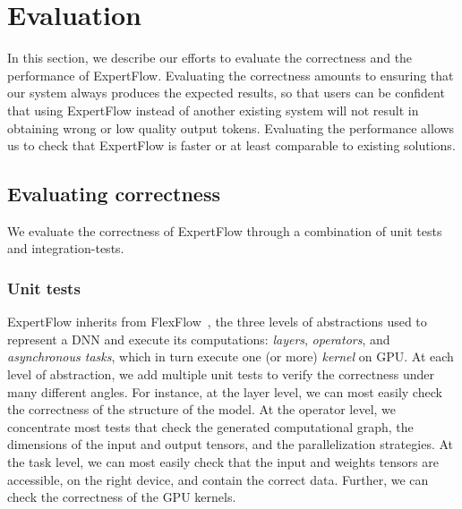 
\chapter{Evaluation}\label{chapter-7}
In this section, we describe our efforts to evaluate the correctness and the performance of ExpertFlow. Evaluating the correctness amounts to ensuring that our system always produces the expected results, so that users can be confident that using ExpertFlow instead of another existing system will not result in obtaining wrong or low quality output tokens. Evaluating the performance allows us to check that ExpertFlow is faster or at least comparable to existing solutions.

\section{Evaluating correctness}\label{eval-correctness}
We evaluate the correctness of ExpertFlow through a combination of unit tests and integration-tests.

\subsection{Unit tests}
ExpertFlow inherits from FlexFlow~\cite{flexflow,unity}, the three levels of abstractions used to represent a DNN and execute its computations: \textit{layers}, \textit{operators}, and \textit{asynchronous tasks}, which in turn execute one (or more) \textit{kernel} on GPU. At each level of abstraction, we add multiple unit tests to verify the correctness under many different angles. For instance, at the layer level, we can most easily check the correctness of the structure of the model. At the operator level, we concentrate most tests that check the generated computational graph, the dimensions of the input and output tensors, and the parallelization strategies. At the task level, we can most easily check that the input and weights tensors are accessible, on the right device, and contain the correct data. Further, we can check the correctness of the GPU kernels. 

